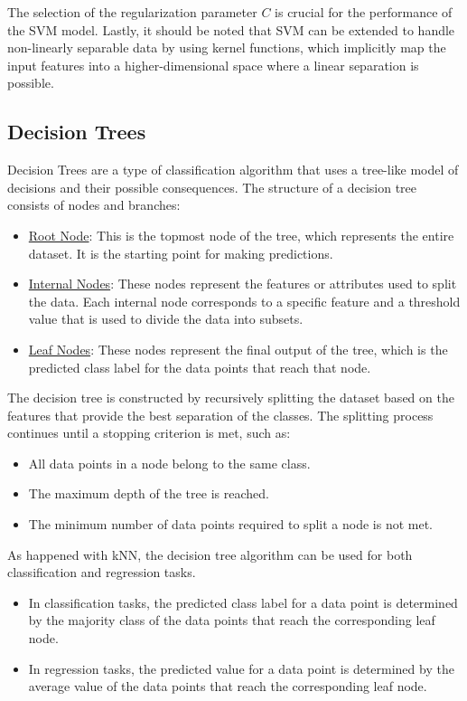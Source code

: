The selection of the regularization parameter $C$ is crucial for the performance of the SVM model. Lastly, it should be noted that SVM can be extended to handle non-linearly separable data by using kernel functions, which implicitly map the input features into a higher-dimensional space where a linear separation is possible.

\subsection{Decision Trees}

Decision Trees are a type of classification algorithm that uses a tree-like model of decisions and their possible consequences. The structure of a decision tree consists of nodes and branches:
\begin{itemize}
    \item \ul{Root Node}: This is the topmost node of the tree, which represents the entire dataset. It is the starting point for making predictions.
    \item \ul{Internal Nodes}: These nodes represent the features or attributes used to split the data. Each internal node corresponds to a specific feature and a threshold value that is used to divide the data into subsets.
    \item \ul{Leaf Nodes}: These nodes represent the final output of the tree, which is the predicted class label for the data points that reach that node.
\end{itemize}

The decision tree is constructed by recursively splitting the dataset based on the features that provide the best separation of the classes. The splitting process continues until a stopping criterion is met, such as:
\begin{itemize}
    \item All data points in a node belong to the same class.
    \item The maximum depth of the tree is reached.
    \item The minimum number of data points required to split a node is not met.
\end{itemize}

As happened with kNN, the decision tree algorithm can be used for both classification and regression tasks.
\begin{itemize}
    \item In classification tasks, the predicted class label for a data point is determined by the majority class of the data points that reach the corresponding leaf node.
    \item In regression tasks, the predicted value for a data point is determined by the average value of the data points that reach the corresponding leaf node.
\end{itemize}

